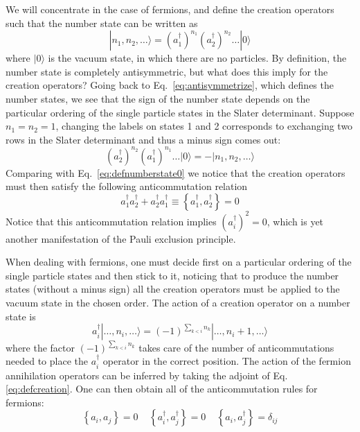 We will concentrate in the case of fermions, and define the creation operators
such that the number state can be written as 
\begin{equation}
 | n_{1}, n_{2}, \ldots \rangle = 
    \left( a_{1}^{\dagger}\right)^{n_{1}} 
    \left( a_{2}^{\dagger}\right)^{n_{2}} \ldots |0\rangle 
\label{eq:defnumberstate0}
\end{equation}
where $|0\rangle$ is the vacuum state, in which there are no particles.  By
definition, the number state is completely antisymmetric, but what does this
imply for the creation operators?  Going back to Eq.~\ref{eq:antisymmetrize},
which defines the number states,  we see that the sign of the number state
depends on the particular ordering of the single particle states in the Slater
determinant.   Suppose $n_{1}=n_{2}=1$, changing the labels on states 1 and 2
corresponds to exchanging two rows in the Slater determinant and thus a minus
sign comes out: 
\begin{equation} 
    \left( a_{2}^{\dagger}\right)^{n_{2}} 
    \left( a_{1}^{\dagger}\right)^{n_{1}} \ldots |0\rangle  = 
  - | n_{1}, n_{2}, \ldots \rangle 
\end{equation}
Comparing with Eq.~\ref{eq:defnumberstate0} we notice that the creation
operators must then satisfy the following anticommutation relation
\begin{equation} 
    a_{1}^{\dagger} a_{2}^{\dagger} + a_{2}^{\dagger} a_{1}^{\dagger} 
   \equiv  \left\lbrace  a_{1}^{\dagger} , a_{2}^{\dagger} \right\rbrace 
   = 0 
\end{equation}
Notice that this anticommutation relation implies $\left( a_{i}^{\dagger}
\right)^{2} = 0$, which is yet another manifestation of the Pauli exclusion
principle.
   
When dealing with fermions, one must decide first on a particular ordering of
the single particle states and then stick to it, noticing that to produce the
number states (without a minus sign) all the creation operators must be applied
to the vacuum state in the chosen order.   The action of a creation operator on
a number state is
\begin{equation}  
  a_{i}^{\dagger}| \ldots, n_{i}, \ldots \rangle 
  =    (-1)^{\sum_{k<i} n_{k}} | \ldots, n_{i}+1, \ldots \rangle 
 \label{eq:defcreation}
\end{equation} 
where the factor $(-1)^{\sum_{k<i} n_{k}}$ takes care of the number of
anticommutations needed to place the $a_{i}^{\dagger}$ operator in the correct
position.  The action of the fermion annihilation operators can be inferred by
taking the adjoint of Eq.~ \ref{eq:defcreation}.  One can then obtain all of
the anticommutation rules for fermions: 
\begin{equation}
  \left\lbrace a_{i}, a_{j} \right\rbrace = 0 \ \ \ \ \  
  \left\lbrace a_{i}^{\dagger}, a_{j}^{\dagger} \right\rbrace = 0 \ \ \ \ \   
  \left\lbrace a_{i},a_{j}^{\dagger} \right\rbrace=\delta_{ij}
\end{equation}


